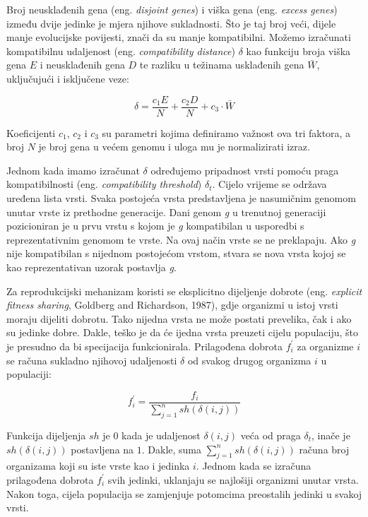 \documentclass[times, utf8, seminar, numeric]{fer}
\begin{document}
Broj neusklađenih gena (eng. \textit{disjoint genes}) i viška gena (eng. \textit{excess genes}) između dvije jedinke je mjera njihove sukladnosti. Što je taj broj veći, dijele manje evolucijske povijesti, znači da su manje kompatibilni. Možemo izračunati kompatibilnu udaljenost (eng. \textit{compatibility distance}) $\delta$ kao funkciju broja viška gena $E$ i neusklađenih gena $D$ te razliku u težinama usklađenih gena $\bar{W}$, uključujući i isključene veze:

\begin{equation}
\delta = \frac{c_1E}{N} + \frac{c_2D}{N} + c_3\cdot\bar{W}
\label{jednakost1}
\end{equation}

Koeficijenti $c_1$, $c_2$ i $c_3$ su parametri kojima definiramo važnost ova tri faktora, a broj $N$ je broj gena u većem genomu i uloga mu je normalizirati izraz.

Jednom kada imamo izračunat $\delta$ određujemo pripadnost vrsti pomoću praga kompatibilnosti (eng. \textit{compatibility threshold}) $\delta_t$. Cijelo vrijeme se održava uređena lista vrsti. Svaka postojeća vrsta predstavljena je nasumičnim genomom unutar vrste iz prethodne generacije. Dani genom \textit{g} u trenutnoj generaciji pozicioniran je u prvu vrstu s kojom je \textit{g} kompatibilan u usporedbi s reprezentativnim genomom te vrste. Na ovaj način vrste se ne preklapaju. Ako \textit{g} nije kompatibilan s nijednom postojećom vrstom, stvara se nova vrsta kojoj se kao reprezentativan uzorak postavlja \textit{g}.

Za reprodukcijski mehanizam koristi se eksplicitno dijeljenje dobrote (eng. \textit{explicit fitness sharing}, Goldberg and Richardson, 1987), gdje organizmi u istoj vrsti moraju dijeliti dobrotu. Tako nijedna vrsta ne može postati prevelika, čak i ako su jedinke dobre. Dakle, teško je da će ijedna vrsta preuzeti cijelu populaciju, što je presudno da bi specijacija funkcionirala. Prilagođena dobrota $f_{i}^{'}$ za organizme $i$ se računa sukladno njihovoj udaljenosti $\delta$ od svakog drugog organizma $i$ u populaciji:

\begin{equation}
f_{i}^{'} = \frac{f_i}{\sum_{j=1}^{n}sh(\delta(i,j))}
\label{jednakost2}
\end{equation}

Funkcija dijeljenja $sh$ je $0$ kada je udaljenost $\delta(i,j)$ veća od praga $\delta_t$, inače je $sh(\delta(i,j))$ postavljena na $1$. Dakle, suma $\sum_{j=1}^{n}sh(\delta(i,j))$ računa broj organizama koji su iste vrste kao i jedinka $i$. Jednom kada se izračuna prilagođena dobrota $f_{i}^{'}$ svih jedinki, uklanjaju se najlošiji organizmi unutar vrsta. Nakon toga, cijela populacija se zamjenjuje potomcima preostalih jedinki u svakoj vrsti.
\end{document}
